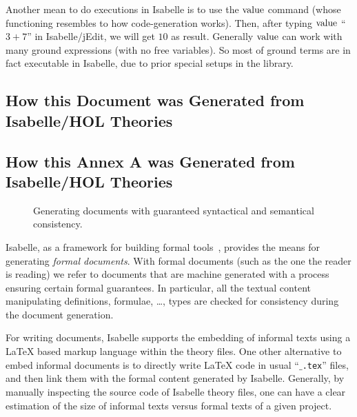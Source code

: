 Another mean to do executions in Isabelle is to use the
$\operatorname{value}$ command (whose
functioning resembles to how code-generation
works). Then, after typing
$\operatorname{value}$ ``$3 + 7$'' in
Isabelle/jEdit, we
will get $10$ as result. Generally
$\operatorname{value}$ can work with many ground
expressions (with no free variables). So most of \OCL ground terms are
in fact executable in Isabelle, due to prior special setups in the
\FOCL library.


\isatagafp
\subsection{How this Document was Generated from Isabelle/HOL Theories}
\endisatagafp
\isatagannexa
\subsection{How this Annex A was Generated from Isabelle/HOL Theories}
\endisatagannexa
\begin{figure}[tb]
  \mbox{}\hfill
  \hfill%
  \hfill%
    \hfill\mbox{}
  \caption{Generating documents with guaranteed  syntactical and
    semantical consistency.}
  \label{fig:gener-docum-where}
\end{figure}
Isabelle, as a framework for building formal
tools~\cite{wenzel.ea:building:2007},
provides the means for generating \emph{formal documents}. With formal
documents (such as the one the reader is reading) we refer to
documents that are machine generated with a process ensuring certain
formal guarantees. In particular, all the textual content manipulating
definitions, formulae, \ldots, types are checked for consistency
during the document generation.

For writing documents, Isabelle supports the embedding of informal
texts using a \LaTeX{} based markup language within the theory
files. One other alternative to embed informal documents is to
directly write \LaTeX{} code in usual ``$\_$\verb|.tex|'' files, and
then link them with the formal content generated by
Isabelle. Generally, by manually inspecting the source code of
Isabelle theory files, one can have a clear estimation of the size of
informal texts versus formal texts of a given project. 

